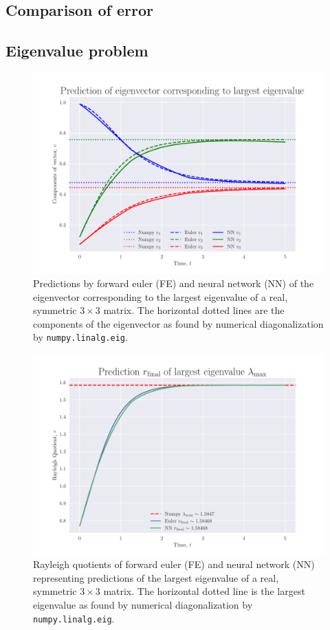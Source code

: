 \documentclass[12pt]{extarticle}
\def\code#1{\texttt{#1}}
\begin{document}
\subsection*{Comparison of error}


\subsection*{Eigenvalue problem}


\begin{figure}[h!]
	\centering
	\includegraphics[scale=0.75]{../output/plots/eigvec_T5_N1000.pdf}
	\caption{Predictions by forward euler (FE) and neural network (NN) of the eigenvector corresponding to the largest eigenvalue of a real, symmetric $3\times 3$ matrix. The horizontal dotted lines are the components of the eigenvector as found by numerical diagonalization by \code{numpy.linalg.eig}.}
	\label{fig:eigvec_T5_N1000}
\end{figure}

\begin{figure}[h!]
	\centering
	\includegraphics[scale=0.75]{../output/plots/eigval_T5_N1000.pdf}
	\caption{Rayleigh quotients of forward euler (FE) and neural network (NN) representing predictions of the largest eigenvalue of a real, symmetric $3\times 3$ matrix. The horizontal dotted line is the largest eigenvalue as found by numerical diagonalization by \code{numpy.linalg.eig}.}
	\label{fig:eigval_T5_N1000}
\end{figure}
\end{document}
